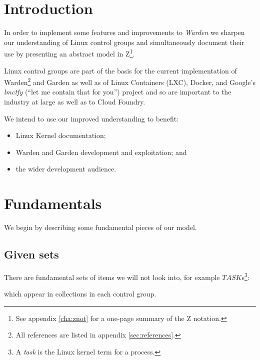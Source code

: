 \documentclass[a4paper,twoside,12pt]{article}
\begin{document}
\section{Introduction}

In order to implement some features and improvements to \emph{Warden} we sharpen our understanding of Linux control groups
and simultaneously document their use by presenting an abstract model in Z\footnote{See appendix \ref{cha:znot} for a one-page summary of the Z notation.}.

Linux control groups are part of the basis for the current implementation of Warden\cite{warden}\footnote{All references are listed in appendix \ref{sec:references}.} and Garden\cite{garden} as well as of Linux Containers (LXC), Docker, and Google's
\textit{lmctfy} (``let me contain that for you'') project and so are important to the industry at large as well as to Cloud
Foundry.

We intend to use our improved understanding to benefit:
\begin{itemize}
\item Linux Kernel documentation;
\item Warden \cite{warden} and Garden \cite{garden} development and exploitation; and
\item the wider development audience.
\end{itemize}



\section{Fundamentals}

We begin by describing some fundamental pieces of our model.

\subsection{Given sets}
There are fundamental sets of items we will not look into, 
for example $TASK$s\footnote{A \emph{task} is the Linux kernel term for a process.}:
\begin{zed}
[TASK]
\end{zed}
which appear in collections in each control group.
\end{document}
